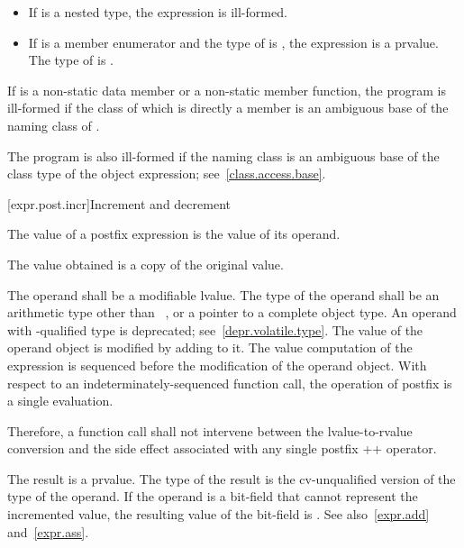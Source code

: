 \begin{itemize}
\item If  is a nested type, the expression  is
ill-formed.

\item If  is a member enumerator and the type of 
is , the expression  is a prvalue. The type of
 is .
\end{itemize}

\pnum
If  is a non-static data member or a non-static member
function, the program is ill-formed if the class of which  is
directly a member is an ambiguous base of
the naming class of .
\begin{note}
The program is also ill-formed if the naming class is an ambiguous base of the class type
of the object expression; see~\ref{class.access.base}.
\end{note}

[expr.post.incr]{Increment and decrement}

\pnum
{}%
%
%
%
The value of a postfix \tcode{++} expression is the value of its
operand.
\begin{note}
The value obtained is a copy of the original value.
\end{note}
The operand shall be a modifiable lvalue. The type of the operand shall
be an arithmetic type other than \cv{}~,
or a pointer to a complete object type.
An operand with -qualified type is deprecated;
see~\ref{depr.volatile.type}.
The value of the operand object is modified by adding  to it.
The
%
value computation of the \tcode{++} expression is sequenced before the
modification of the operand object. With respect to an
indeterminately-sequenced function call, the operation of postfix
\tcode{++} is
a single evaluation.
\begin{note}
Therefore, a function call shall not intervene between the
lvalue-to-rvalue conversion and the side effect associated with any
single postfix ++ operator.
\end{note}
The result is a prvalue. The type of the result is the cv-unqualified
version of the type of the operand.
If the operand is a bit-field that cannot represent the incremented value, the
resulting value of the bit-field is
.
See also~\ref{expr.add}
and~\ref{expr.ass}.

